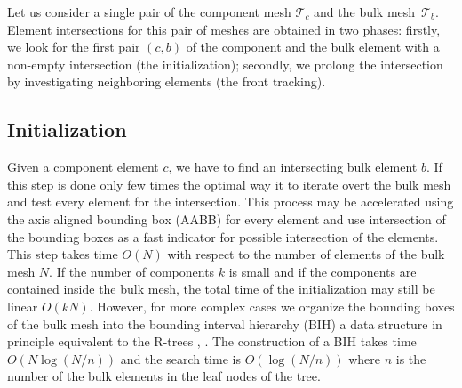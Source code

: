 \documentclass{elsarticle}
\begin{document}
Let us consider a single pair of the component mesh $\mathcal T_c$ and the bulk mesh~$\mathcal T_b$. 
Element intersections for this pair of meshes are obtained in two phases: firstly, we look for the 
first pair $(c,b)$ of the component and the bulk element with a non-empty intersection (the initialization); 
secondly, we prolong the intersection by investigating neighboring elements (the front tracking).



\subsection{Initialization}
\label{sec:initialization}
Given a component element $c$, we have to find an intersecting bulk element $b$.
If this step is done only few times the optimal way it to iterate overt the bulk mesh and test every element for the intersection.
This process may be accelerated using the axis aligned bounding box (AABB) for every element and use intersection of the bounding boxes
as a fast indicator for possible intersection of the elements. This step takes time $O(N)$ with respect to the number of elements of the bulk mesh $N$.
If the number of components $k$ is small and if the components are contained inside the bulk mesh, the total time of the initialization 
may still be linear $O(kN)$. However, for more complex cases we organize the bounding boxes of the bulk mesh into the bounding interval
hierarchy (BIH) \cite{EGWR:EGSR06:139-149} a data structure in principle equivalent 
to the R-trees \cite{guttman_r-trees:_1984}, \cite{nam_comparative_2004}. The construction of a BIH takes time $O(N\log(N/n))$ 
and the search time is $O(\log(N/n))$ where $n$ is the number of the bulk elements in the leaf nodes of the tree.
 
\end{document}
